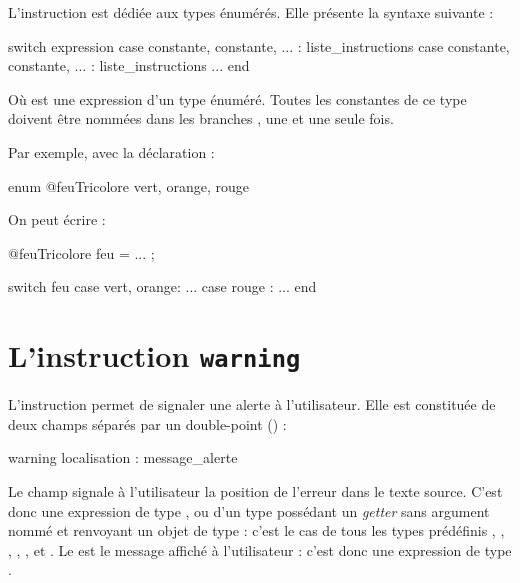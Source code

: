 {{

L'instruction  est dédiée aux types énumérés. Elle présente la syntaxe suivante :

\begin{galgascode}
switch expression
case constante, constante, ... :
  liste_instructions
case constante, constante, ... :
  liste_instructions
...
end
\end{galgascode}


Où  est une expression d'un type énuméré. Toutes les constantes de ce type doivent être nommées dans les branches , une et une seule fois.

Par exemple, avec la déclaration :

\begin{galgascode}
enum @feuTricolore {
  vert, orange, rouge   
}
\end{galgascode}

On peut écrire :

\begin{galgascode}
@feuTricolore feu = ... ;

switch feu
case vert, orange:
  ...
case rouge :
  ...
end
\end{galgascode}














\section{L'instruction \texttt{warning}}

L'instruction  permet de signaler une alerte à l'utilisateur. Elle est constituée de deux champs séparés par un double-point (\galgas{\:}) :

{
\begin{galgascode}
warning localisation : message_alerte
\end{galgascode}



Le champ  signale à l'utilisateur la position de l'erreur dans le texte source. C'est donc une expression de type , ou d'un type possédant un \emph{getter} sans argument nommé  et renvoyant un objet de type  : c'est le cas de tous les types prédéfinis , , , , ,  et . Le  est le message affiché à l'utilisateur : c'est donc une expression de type .

}}}
